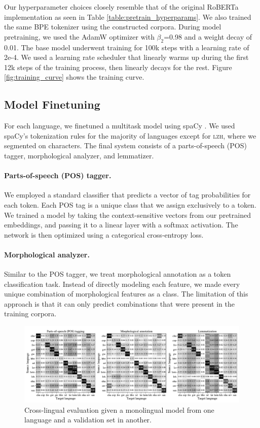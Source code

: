 \documentclass[11pt]{article}
\begin{document}


Our hyperparameter choices closely resemble that of the original RoBERTa implementation as seen in Table \ref{table:pretrain_hyperparams}.
We also trained the same BPE tokenizer \citep{sennrich-etal-2016-neural} using the constructed corpora.
During model pretraining, we used the AdamW optimizer with $\beta_2$=0.98 and a weight decay of 0.01.
The base model underwent training for 100k steps with a learning rate of 2e-4.
We used a learning rate scheduler that linearly warms up during the first 12k steps of the training process, then linearly decays for the rest.
Figure \ref{fig:training_curve} shows the training curve.

\subsection{Model Finetuning}

For each language, we finetuned a multitask model using spaCy \cite{honnibal-etal-2020-spacy}. 
We used spaCy's tokenization rules for the majority of languages except for \textsc{lzh}, where we segmented on characters.
The final system consists of a parts-of-speech (POS) tagger, morphological analyzer, and lemmatizer.

\paragraph{Parts-of-speech (POS) tagger.}
We employed a standard classifier that predicts a vector of tag probabilities for each token.
Each POS tag is a unique class that we assign exclusively to a token.
We trained a model by taking the context-sensitive vectors from our pretrained embeddings, and passing it to a linear layer with a softmax activation.
The network is then optimized using a categorical cross-entropy loss.

\paragraph{Morphological analyzer.}
Similar to the POS tagger, we treat morphological annotation as a token classification task.
Instead of directly modeling each feature, we made every unique combination of morphological features as a class.
The limitation of this approach is that it can only predict combinations that were present in the training corpora.

\begin{figure}[t]
\centering
\includegraphics[width=\textwidth]{figures/cross_lingual.pdf}
\caption{Cross-lingual evaluation given a monolingual model from one language and a validation set in another.}
\label{fig:cross_lingual}
\end{figure}
\end{document}
